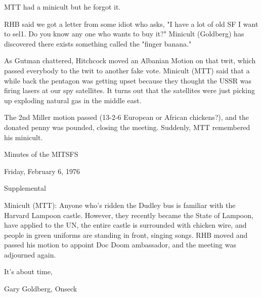 \documentclass[12pt]{article}
\begin{document}
MTT had a minicult but he forgot it.

RHB said we got a letter from some idiot who asks, "I have a lot of old SF I want to sel1. Do you know any one who wants to buy it?" Minicult (Goldberg) has discovered there exists something called the "finger banana."

As Gutman chattered, Hitchcock moved an Albanian Motion on
that twit, which passed everybody to the twit to another fake vote. Minicult (MTT) said that a while back the pentagon was getting upset because they thought the USSR was firing lasers at our spy satellites. It turns out that the satellites were just picking up exploding natural gas in the middle east.

The 2nd Miller motion passed (13-2-6 European or African chickens?), and the donated penny was pounded, closing the meeting. Suddenly, MTT remembered his minicult.

\begin{center}

Minutes of the MITSFS

Friday, February 6, 1976

Supplemental

\end{center}

Minicult (MTT): Anyone who's ridden the Dudley bus is familiar with the Harvard Lampoon castle. However, they recently became the State of Lampoon, have applied to the UN, the entire castle is surrounded with chicken wire, and people in green uniforms are standing in front, singing songs. RHB moved and passed his motion to appoint Doc Doom ambassador, and the meeting was adjourned again.

\vspace{12pt}

\centerline{It's about time,}
\centerline{Gary Goldberg, Onseck}
\end{document}
